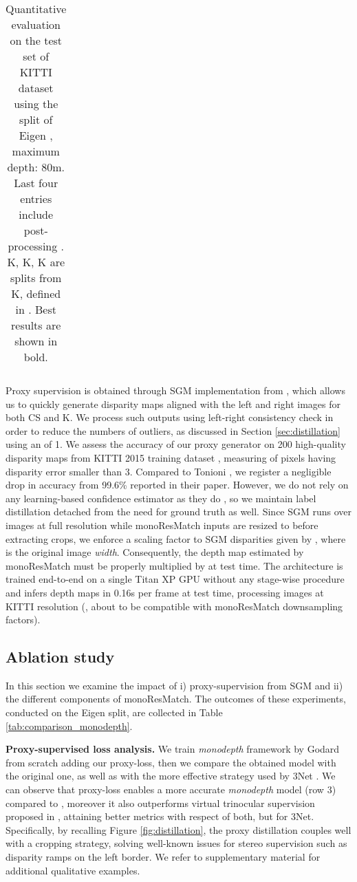 \documentclass[10pt,twocolumn,letterpaper]{article}
\begin{document}
\begin{table*}[!htbp]
{\begin{tabular}{l|c|c|cccc|ccc}
\hline
\end{tabular}
}
\smallskip
\caption{Quantitative evaluation on the test set of KITTI dataset \cite{KITTI_RAW} using the split of Eigen \etal \cite{eigen2014depth}, maximum depth: 80m. Last four entries include post-processing \cite{monodepth17}. K, K, K are splits from K, defined in \cite{yang2018deep}. Best results are shown in bold. }
\label{table:eigen}
\end{table*} Proxy supervision is obtained through SGM implementation from \cite{spangenberg2014large}, which allows us to quickly generate disparity maps aligned with the left and right images for both CS and K. We process such outputs using left-right consistency check in order to reduce the numbers of outliers, as discussed in Section \ref{sec:distillation} using an  of 1. We assess the accuracy of our proxy generator on 200 high-quality disparity maps from KITTI 2015 training dataset \cite{KITTI_2015}, measuring  of pixels having disparity error smaller than 3. Compared to Tonioni \etal \cite{Tonioni_2017_ICCV}, we register a negligible drop in accuracy from 99.6\% reported in their paper. However, we do not rely on any learning-based confidence estimator as they do \cite{Poggi_2016_BMVC}, so we maintain label distillation detached from the need for ground truth as well.
Since SGM runs over images at full resolution while monoResMatch inputs are resized to  before extracting crops, we enforce a scaling factor to SGM disparities given by , where  is the original image \textit{width}. Consequently, the depth map estimated by monoResMatch must be properly multiplied by  at test time.  
The architecture is trained end-to-end on a single Titan XP GPU without any stage-wise procedure and infers depth maps in 0.16s per frame at test time, processing images at KITTI resolution (\ie, about  to be compatible with monoResMatch downsampling factors).

\subsection{Ablation study}
In this section we examine the impact of i) proxy-supervision from SGM and ii) the different components of monoResMatch. The outcomes of these experiments, conducted on the Eigen split, are collected in Table \ref{tab:comparison_monodepth}. 

\textbf{Proxy-supervised loss analysis.} We train \emph{monodepth} framework by Godard \etal \cite{monodepth17} from scratch adding our proxy-loss, then we compare the obtained model with the original one, as well as with the more effective strategy used by 3Net \cite{3net18}. We can observe that proxy-loss enables a more accurate \emph{monodepth} model (row 3) compared to \cite{monodepth17}, moreover it also outperforms virtual trinocular supervision proposed in \cite{3net18}, attaining better metrics with respect of both, but  for 3Net. 
Specifically, by recalling Figure \ref{fig:distillation}, the proxy distillation couples well with a cropping strategy, solving well-known issues for stereo supervision such as disparity ramps on the left border. 
We refer to supplementary material for additional qualitative examples.
\end{document}
